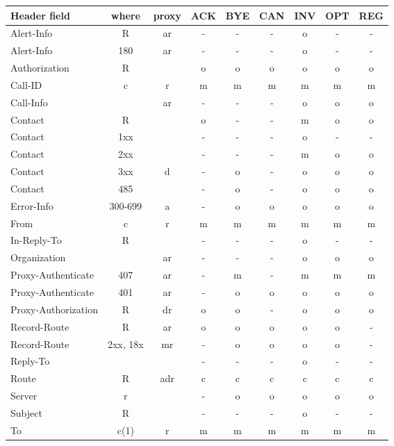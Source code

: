 \documentclass[letterpaper,notitlepage,times,12pt]{article}
\begin{document}
\begin{table}[!h]
\begin{center}
\begin{tabular}{|l|c|c|c|c|c|c|c|c|} \hline
Header field & where & proxy & ACK & BYE & CAN & INV & OPT & REG \\
\hline\hline
{\sf Alert-Info} & R & ar & - & - & - & o & - & - \\
{\sf Alert-Info} & 180 & ar & - & - & - & o & - & - \\ \hline
{\sf Authorization} & R & & o & o & o & o & o & o \\ \hline
{\sf Call-ID} & c & r & m & m & m & m & m & m \\ \hline
{\sf Call-Info} & & ar & - & - & - & o & o & o \\ \hline
{\sf Contact} & R & & o & - & - & m & o & o \\
{\sf Contact} & 1xx & & - & - & - & o & - & - \\
{\sf Contact} & 2xx & & - & - & - & m & o & o \\
{\sf Contact} & 3xx & d & - & o & - & o & o & o \\
{\sf Contact} & 485 & & - & o & - & o & o & o \\ \hline
{\sf Error-Info} & 300-699 & a & - & o & o & o & o & o \\ \hline
{\sf From} & c & r & m & m & m & m & m & m \\ \hline
{\sf In-Reply-To} & R & & - & - & - & o & - & - \\ \hline
{\sf Organization} & & ar & - & - & - & o & o & o \\ \hline
{\sf Proxy-Authenticate} & 407 & ar & - & m & - & m & m & m \\
{\sf Proxy-Authenticate} & 401 & ar & - & o & o & o & o & o \\
{\sf Proxy-Authorization} & R & dr & o & o & - & o & o & o \\ \hline
{\sf Record-Route} & R & ar & o & o & o & o & o & - \\
{\sf Record-Route} & 2xx, 18x & mr & - & o & o & o & o & - \\ \hline
{\sf Reply-To} & & & - & - & - & o & - & - \\ \hline
{\sf Route} & R & adr & c & c & c & c & c & c \\ \hline
{\sf Server} & r & & - & o & o & o & o & o \\ \hline
{\sf Subject} & R & & - & - & - & o & - & - \\ \hline
{\sf To} & c(1) & r & m & m & m & m & m & m \\ \hline

\end{tabular}
\end{center}
\end{table}
\end{document}

